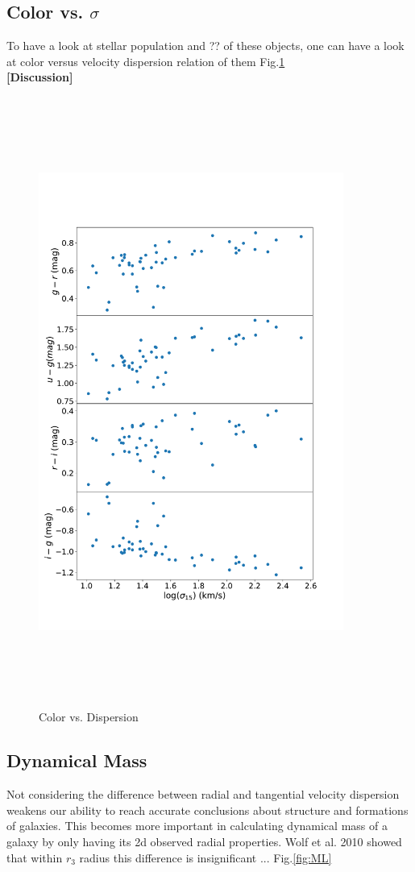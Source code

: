 \documentclass{aa}
\begin{document}
\subsection{Color vs. $\sigma$}
To have a look at stellar population and ?? of these objects, one can have a look at color versus velocity dispersion relation of them Fig.\ref{fig:CI-S}\\
\textbf{[Discussion]} 
\begin{figure}[!htb]
   \centering
   \includegraphics[width=10cm,height=20cm,keepaspectratio]{../2_pipeline/2_color_Disp/Color_Disp.pdf}
         \caption{Color vs. Dispersion}
         \label{fig:CI-S}
\end{figure}

\subsection{Dynamical Mass}
Not considering the difference between radial and tangential velocity dispersion weakens our ability to reach accurate conclusions about structure and formations of galaxies. This becomes more important in calculating dynamical mass of a galaxy by only having its 2d observed radial properties. Wolf et al. 2010 showed that within $r_3$ radius this difference is insignificant ...
Fig.\ref{fig:ML}
\end{document}
